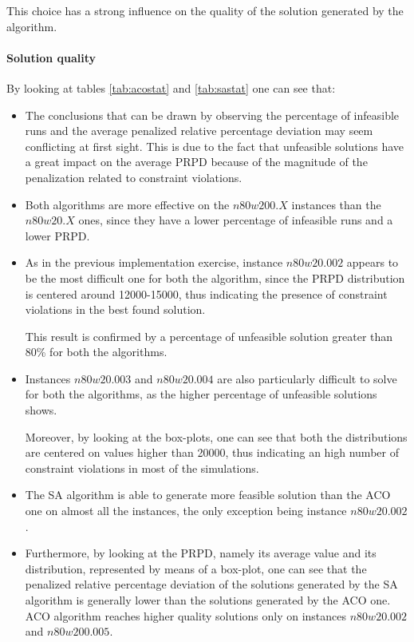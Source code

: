 This choice has a strong influence on the quality of the solution generated by the algorithm.

\paragraph{Solution quality}

By looking at tables \ref{tab:acostat} and \ref{tab:sastat} one can see that:
\begin{itemize}

\item The conclusions that can be drawn by observing the percentage of infeasible runs and the average penalized relative percentage deviation may seem conflicting at first sight. 
This is due to the fact that unfeasible solutions have a great impact on the average PRPD because of the magnitude of the penalization related to constraint violations.

\item Both algorithms are more effective on the $n80w200.X$ instances than the $n80w20.X$ ones, since they have a lower percentage of infeasible runs and a lower PRPD.

\item As in the previous implementation exercise, instance $n80w20.002$ appears to be the most difficult one for both the algorithm, since the PRPD distribution is centered around 12000-15000, thus indicating the presence of constraint violations in the best found solution.

This result is confirmed by a percentage of unfeasible solution greater than 80\% for both the algorithms.

\item Instances $n80w20.003$ and $n80w20.004$ are also particularly difficult to solve for both the algorithms, as the higher percentage of unfeasible solutions shows.

Moreover, by looking at the box-plots, one can see that both the distributions are centered on values higher than 20000, thus indicating an high number of constraint violations in most of the simulations.


\item The SA algorithm is able to generate more feasible solution than the ACO one on almost all the instances, the only exception being instance $n80w20.002$.

\item Furthermore, by looking at the PRPD, namely its average value and its distribution, represented by means of a box-plot, one can see that the penalized relative percentage deviation of the solutions generated by the SA algorithm is generally lower than the solutions generated by the ACO one.
ACO algorithm reaches higher quality solutions only on instances $n80w20.002$ and $n80w200.005$.


\end{itemize}
